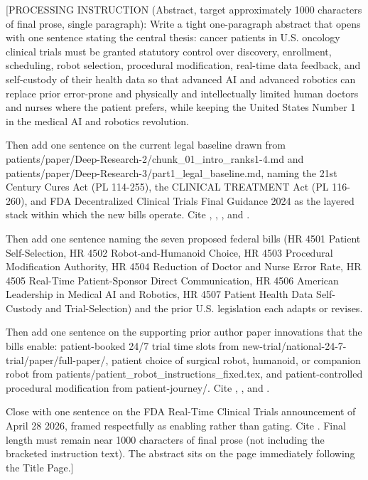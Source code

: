 
[PROCESSING INSTRUCTION (Abstract, target approximately 1000 characters
of final prose, single paragraph): Write a tight one-paragraph abstract
that opens with one sentence stating the central thesis: cancer
patients in U.S. oncology clinical trials must be granted statutory
control over discovery, enrollment, scheduling, robot selection,
procedural modification, real-time data feedback, and self-custody of
their health data so that advanced AI and advanced robotics can replace
prior error-prone and physically and intellectually limited human
doctors and nurses where the patient prefers, while keeping the
United States Number 1 in the medical AI and robotics revolution.

Then add one sentence on the current legal baseline drawn from
patients/paper/Deep-Research-2/chunk\_01\_intro\_ranks1-4.md and
patients/paper/Deep-Research-3/part1\_legal\_baseline.md, naming the
21st Century Cures Act (PL 114-255), the CLINICAL TREATMENT Act
(PL 116-260), and FDA Decentralized Clinical Trials Final Guidance
2024 as the layered stack within which the new bills operate. Cite
\cite{rank1_cures_act_2016}, \cite{rank2_clinical_treatment_act_2020},
\cite{fda_dct_guidance_2024}, and \cite{usc_300gg8_clinical_trials}.

Then add one sentence naming the seven proposed federal bills (HR 4501
Patient Self-Selection, HR 4502 Robot-and-Humanoid Choice, HR 4503
Procedural Modification Authority, HR 4504 Reduction of Doctor and
Nurse Error Rate, HR 4505 Real-Time Patient-Sponsor Direct
Communication, HR 4506 American Leadership in Medical AI and Robotics,
HR 4507 Patient Health Data Self-Custody and Trial-Selection) and the
prior U.S. legislation each adapts or revises.

Then add one sentence on the supporting prior author paper innovations
that the bills enable: patient-booked 24/7 trial time slots from
new-trial/national-24-7-trial/paper/full-paper/, patient choice of
surgical robot, humanoid, or companion robot from
patients/patient\_robot\_instructions\_fixed.tex, and patient-controlled
procedural modification from patient-journey/. Cite
\cite{kawchak_2026_19994945}, \cite{kawchak_2026_18810541}, and
\cite{kawchak_2026_19119939}.

Close with one sentence on the FDA Real-Time Clinical Trials
announcement of April 28 2026, framed respectfully as enabling rather
than gating. Cite \cite{fda_rtct_press_2026}. Final length must remain
near 1000 characters of final prose (not including the bracketed
instruction text). The abstract sits on the page immediately following
the Title Page.]

